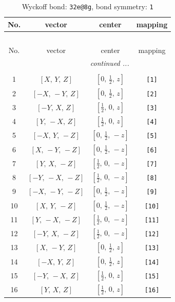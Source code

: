 \documentclass[fleqn,8pt]{jsarticle}
\begin{document}
\begin{longtable}{cccc}
\caption{Wyckoff bond: {\tt 32e@8g}, bond symmetry: {\tt 1}}
 \\
 \hline \hline
No. & vector & center & mapping \\ \hline \endfirsthead

\multicolumn{3}{l}{\tablename\ \thetable{}} \\
 \hline \hline
No. & vector & center & mapping \\ \hline \endhead

 \hline \hline
\multicolumn{3}{r}{\footnotesize\it continued ...} \\ \endfoot

 \hline \hline
\multicolumn{3}{r}{} \\ \endlastfoot

1 & $\left[ X,\, Y,\, Z \right]$ & $\left[ 0,\, \frac{1}{2},\, z \right]$ & {\tt [1]} \\ \hline
2 & $\left[ - X,\, - Y,\, Z \right]$ & $\left[ 0,\, \frac{1}{2},\, z \right]$ & {\tt [2]} \\ \hline
3 & $\left[ - Y,\, X,\, Z \right]$ & $\left[ \frac{1}{2},\, 0,\, z \right]$ & {\tt [3]} \\ \hline
4 & $\left[ Y,\, - X,\, Z \right]$ & $\left[ \frac{1}{2},\, 0,\, z \right]$ & {\tt [4]} \\ \hline
5 & $\left[ - X,\, Y,\, - Z \right]$ & $\left[ 0,\, \frac{1}{2},\, - z \right]$ & {\tt [5]} \\ \hline
6 & $\left[ X,\, - Y,\, - Z \right]$ & $\left[ 0,\, \frac{1}{2},\, - z \right]$ & {\tt [6]} \\ \hline
7 & $\left[ Y,\, X,\, - Z \right]$ & $\left[ \frac{1}{2},\, 0,\, - z \right]$ & {\tt [7]} \\ \hline
8 & $\left[ - Y,\, - X,\, - Z \right]$ & $\left[ \frac{1}{2},\, 0,\, - z \right]$ & {\tt [8]} \\ \hline
9 & $\left[ - X,\, - Y,\, - Z \right]$ & $\left[ 0,\, \frac{1}{2},\, - z \right]$ & {\tt [9]} \\ \hline
10 & $\left[ X,\, Y,\, - Z \right]$ & $\left[ 0,\, \frac{1}{2},\, - z \right]$ & {\tt [10]} \\ \hline
11 & $\left[ Y,\, - X,\, - Z \right]$ & $\left[ \frac{1}{2},\, 0,\, - z \right]$ & {\tt [11]} \\ \hline
12 & $\left[ - Y,\, X,\, - Z \right]$ & $\left[ \frac{1}{2},\, 0,\, - z \right]$ & {\tt [12]} \\ \hline
13 & $\left[ X,\, - Y,\, Z \right]$ & $\left[ 0,\, \frac{1}{2},\, z \right]$ & {\tt [13]} \\ \hline
14 & $\left[ - X,\, Y,\, Z \right]$ & $\left[ 0,\, \frac{1}{2},\, z \right]$ & {\tt [14]} \\ \hline
15 & $\left[ - Y,\, - X,\, Z \right]$ & $\left[ \frac{1}{2},\, 0,\, z \right]$ & {\tt [15]} \\ \hline
16 & $\left[ Y,\, X,\, Z \right]$ & $\left[ \frac{1}{2},\, 0,\, z \right]$ & {\tt [16]} \\
\end{longtable}
\end{document}
